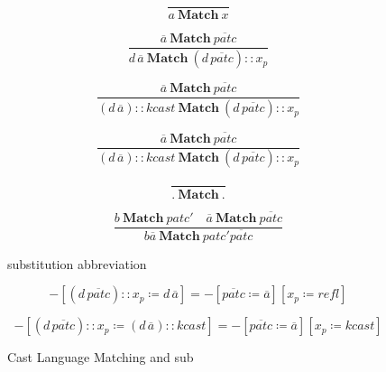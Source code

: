 \begin{figure}


\[
\frac{\,}{a\ \mathbf{Match}\ x}
\]

\[
\frac{\overline{a}\ \mathbf{Match}\ \overline{patc}}{d\,\overline{a}\ \mathbf{Match}\ \left(d\,\overline{patc}\right)::x_{p}}
\]

\[
\frac{\overline{a}\ \mathbf{Match}\ \overline{patc}}{\left(d\,\overline{a}\right)::kcast\ \mathbf{Match}\ \left(d\,\overline{patc}\right)::x_{p}}
\]

\[
\frac{\overline{a}\ \mathbf{Match}\ \overline{patc}}{\left(d\,\overline{a}\right)::kcast\ \mathbf{Match}\ \left(d\,\overline{patc}\right)::x_{p}}
\]

\[
\frac{\,}{.\ \mathbf{Match}\ .}
\]

\[
\frac{b\ \mathbf{Match}\ patc'\quad\overline{a}\ \mathbf{Match}\ \overline{patc}}{b\overline{a}\ \mathbf{Match}\ patc'\overline{patc}}
\]

substitution abbreviation

\[
-\left[\left(d\,\overline{patc}\right)::x_{p}\coloneqq d\,\overline{a}\right]=-\left[\overline{patc}\coloneqq\overline{a}\right]\left[x_{p}\coloneqq refl\right]
\]

\[
-\left[\left(d\,\overline{patc}\right)::x_{p}\coloneqq\left(d\,\overline{a}\right)::kcast\right]=-\left[\overline{patc}\coloneqq\overline{a}\right]\left[x_{p}\coloneqq kcast\right]
\]

\caption{Cast Language Matching and sub}
\label{fig:cast-data-match}
\end{figure}


